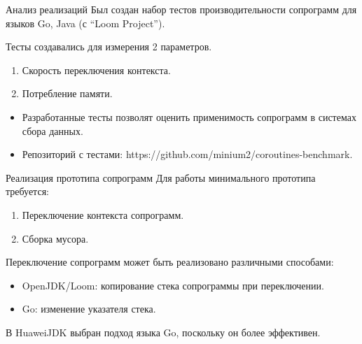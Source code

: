 \begin{frame}{Анализ реализаций}
	Был создан набор тестов производительности сопрограмм для языков Go, Java (с “Loom Project”).
	
	Тесты создавались для измерения 2 параметров.
	\begin{enumerate}
		\item Скорость переключения контекста.
		\item Потребление памяти.
	\end{enumerate}
	\begin{itemize}
		\item Разработанные тесты позволят оценить применимость сопрограмм в системах сбора данных.
		\item Репозиторий с тестами: https://github.com/minium2/coroutines-benchmark.
	\end{itemize}
\end{frame}

\begin{frame}{Реализация прототипа сопрограмм}
	Для работы минимального прототипа требуется:
	\begin{enumerate}
		\item Переключение контекста сопрограмм.
		\item Сборка мусора.
	\end{enumerate}
	Переключение сопрограмм может быть реализовано различными способами:
	\begin{itemize}
		\item OpenJDK/Loom: копирование стека сопрограммы при переключении.
		\item Go: изменение указателя стека.
	\end{itemize}
	В HuaweiJDK выбран подход языка Go, поскольку он более эффективен.
\end{frame}

